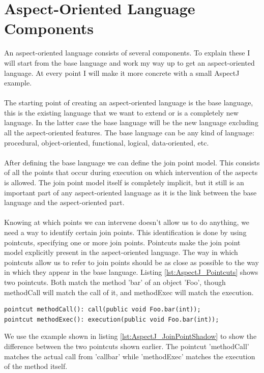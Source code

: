 \documentclass[a4paper]{report}
\begin{document}
\chapter{Aspect-Oriented Language Components}
\label{chap:AOP_Components}
An aspect-oriented language consists of several components. To explain these I will start from the base language and work my way up to get an aspect-oriented language. At every point I will make it more concrete with a small AspectJ example.\\
\\
The starting point of creating an aspect-oriented language is the base language, this is the existing language that we want to extend or is a completely new language. In the latter case the base language will be the new language excluding all the aspect-oriented features. The base language can be any kind of language: procedural, object-oriented, functional, logical, data-oriented, etc.\\
\\
After defining the base language we can define the join point model. This consists of all the points that occur during execution on which intervention of the aspects is allowed. The join point model itself is completely implicit, but it still is an important part of any aspect-oriented language as it is the link between the base language and the aspect-oriented part.\\
\\
Knowing at which points we can intervene doesn't allow us to do anything, we need a way to identify certain join points. This identification is done by using pointcuts, specifying one or more join points. Pointcuts make the join point model explicitly present in the aspect-oriented language. The way in which pointcuts allow us to refer to join points should be as close as possible to the way in which they appear in the base language. Listing \ref{lst:AspectJ_Pointcuts} shows two pointcuts. Both match the method 'bar' of an object 'Foo', though methodCall will match the call of it, and methodExec will match the execution.
\begin{lstlisting}[caption=Two method pointcuts.,label=lst:AspectJ_Pointcuts]
pointcut methodCall(): call(public void Foo.bar(int));
pointcut methodExec(): execution(public void Foo.bar(int));
\end{lstlisting}
 We use the example shown in listing \ref{lst:AspectJ_JoinPointShadow} to show the difference between the two pointcuts shown earlier. The pointcut 'methodCall' matches the actual call from 'callbar' while 'methodExec' matches the execution of the method itself.\\
\end{document}
